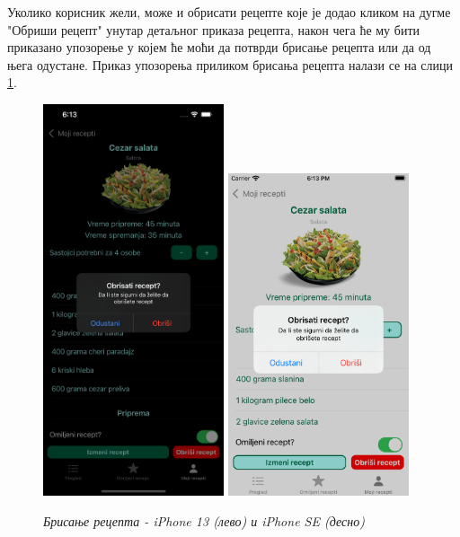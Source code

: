 \documentclass[12pt,oneside]{memoir}
\begin{document}
\indent Уколико корисник жели, може и обрисати рецепте које је додао кликом на дугме "Обриши рецепт" унутар детаљног приказа рецепта, након чега ће му бити приказано упозорење у којем ће моћи да потврди брисање рецепта или да од њега одустане. Приказ упозорења приликом брисања рецепта налази се на слици \ref{slika:брисање_рецепта_1}.

\begin{figure} [H]
    \centering
    \captionsetup{justification=centering}
    \includegraphics[width=0.475\textwidth]{images/simulators/view images/dark - delete.png} 
    \hfill
    \includegraphics[width=0.475\textwidth]{images/simulators/view images/light - delete.png}
    \caption{\textit{Брисање рецепта - iPhone 13 (лево) и iPhone SE (десно)}}
    \label{slika:брисање_рецепта_1} 
\end{figure}
\end{document}
